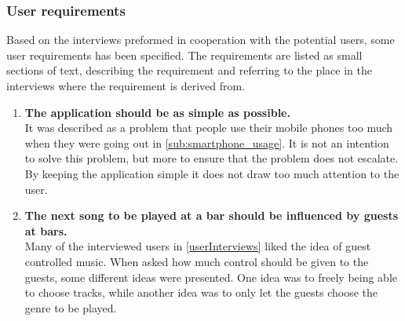 \subsubsection{User requirements}
\label{sub:user_requirements}

Based on the interviews preformed in cooperation with the potential users, some user requirements has been specified. The requirements are listed as small sections of text, describing the requirement and referring to the place in the interviews where the requirement is derived from.

\begin{enumerate}
    \item \textbf{The application should be as simple as possible.}\\
        It was described as a problem that people use their mobile phones too much when they were going out in \cref{sub:smartphone_usage}. It is not an intention to solve this problem, but more to ensure that the problem does not escalate. By keeping the application simple it does not draw too much attention to the user.
    \item \textbf{The next song to be played at a bar should be influenced by guests at bars.} \\
      Many of the interviewed users in \cref{userInterviews} liked the idea of guest controlled music. When asked how much control should be given to the guests, some different ideas were presented. One idea was to freely being able to choose tracks, while another idea was to only let the guests choose the genre to be played.
\end{enumerate}
